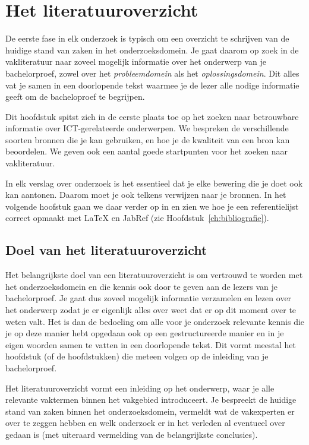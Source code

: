 \chapter{Het literatuuroverzicht}%
\label{ch:literatuuroverzicht}

De eerste fase in elk onderzoek is typisch om een overzicht te schrijven van de huidige stand van zaken in het onderzoeksdomein. Je gaat daarom op zoek in de vakliteratuur naar zoveel mogelijk informatie over het onderwerp van je bachelorproef, zowel over het \emph{probleemdomein} als het \emph{oplossingsdomein}. Dit alles vat je samen in een doorlopende tekst waarmee je de lezer alle nodige informatie geeft om de bacheloproef te begrijpen.

Dit hoofdstuk spitst zich in de eerste plaats toe op het zoeken naar betrouwbare informatie over ICT-gerelateerde onderwerpen. We bespreken de verschillende soorten bronnen die je kan gebruiken, en hoe je de kwaliteit van een bron kan beoordelen. We geven ook een aantal goede startpunten voor het zoeken naar vakliteratuur.

In elk verslag over onderzoek is het essentieel dat je elke bewering die je doet ook kan aantonen. Daarom moet je ook telkens verwijzen naar je bronnen. In het volgende hoofstuk gaan we daar verder op in en zien we hoe je een referentielijst correct opmaakt met {\LaTeX} en JabRef (zie Hoofdstuk~\ref{ch:bibliografie}).

\section{Doel van het literatuuroverzicht}%
\label{sec:doel-literatuuroverzicht}

Het belangrijkste doel van een literatuuroverzicht is om vertrouwd te worden met het onderzoeksdomein en die kennis ook door te geven aan de lezers van je bachelorproef. Je gaat dus zoveel mogelijk informatie verzamelen en lezen over het onderwerp zodat je er eigenlijk alles over weet dat er op dit moment over te weten valt. Het is dan de bedoeling om alle voor je onderzoek relevante kennis die je op deze manier hebt opgedaan ook op een gestructureerde manier en in je eigen woorden samen te vatten in een doorlopende tekst. Dit vormt meestal het hoofdstuk (of de hoofdstukken) die meteen volgen op de inleiding van je bachelorproef.

Het literatuuroverzicht vormt een inleiding op het onderwerp, waar je alle relevante vaktermen binnen het vakgebied introduceert. Je bespreekt de huidige stand van zaken binnen het onderzoeksdomein, vermeldt wat de vakexperten er over te zeggen hebben en welk onderzoek er in het verleden al eventueel over gedaan is (met uiteraard vermelding van de belangrijkste conclusies).

